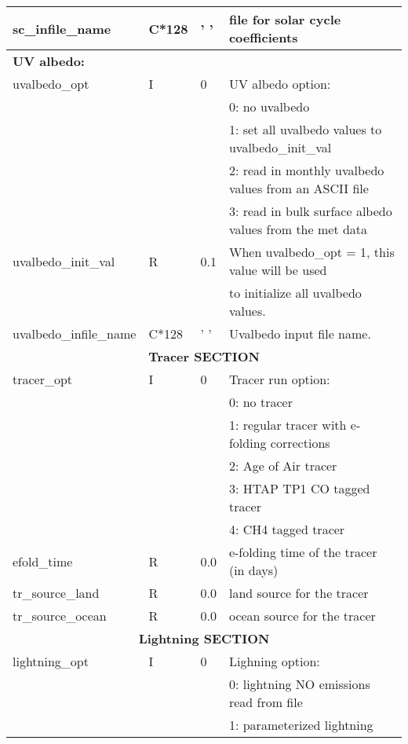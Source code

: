 {\begin{landscape}
\begin{center}
\begin{longtable}{|l|l|l|l|}
sc\_infile\_name &C*128 & ' ' & file for solar cycle coefficients  \\ \hline
\multicolumn{4}{|l|}{\bf UV albedo:} \\ \hline
uvalbedo\_opt         & I & 0 & UV albedo option:  \\
                 &   &   &    0:  no uvalbedo  \\
                 &   &   &    1:  set all uvalbedo values to uvalbedo\_init\_val  \\
                 &   &   &    2:  read in monthly uvalbedo values from an ASCII file  \\
                 &   &   &    3:  read in bulk surface albedo values from the  met data \\ \hline
uvalbedo\_init\_val    & R & 0.1 & When uvalbedo\_opt = 1, this value will be used  \\
                 &   &   &        to initialize all uvalbedo values.  \\ \hline
uvalbedo\_infile\_name & C*128 & ' ' & Uvalbedo input file name.  \\ \hline \hline
%
%
%
\multicolumn{4}{|c|}{\bf Tracer SECTION} \\ \hline\hline
tracer\_opt       & I & 0 & Tracer run option:  \\
                 &   &   &         0:  no tracer  \\
                 &   &   &         1:  regular tracer with e-folding corrections  \\
                 &   &   &         2:  Age of Air tracer  \\
                 &   &   &         3:  HTAP TP1 CO tagged tracer  \\
                 &   &   &         4:  CH4 tagged tracer \\ \hline
efold\_time      & R & 0.0 & e-folding time of the tracer (in days)  \\ \hline
tr\_source\_land      & R & 0.0 & land source for the tracer  \\ \hline
tr\_source\_ocean      & R & 0.0 & ocean source for the tracer  \\ \hline\hline
%
%
%
\multicolumn{4}{|c|}{\bf Lightning SECTION} \\ \hline\hline
lightning\_opt       & I & 0 & Lighning option:  \\
                 &   &   &         0:  lightning NO emissions read from file  \\
                 &   &   &         1:  parameterized lightning  \\ 

\end{longtable}
\end{center}
\end{landscape}}
